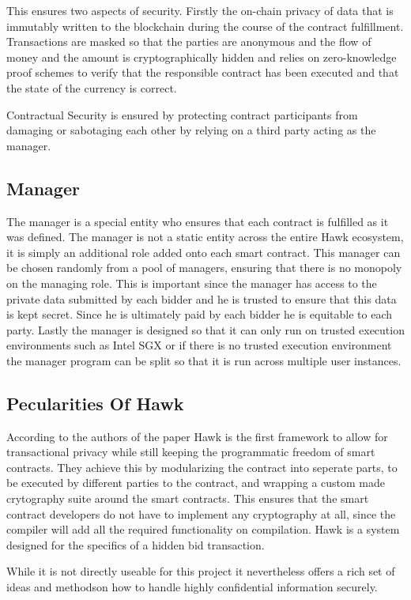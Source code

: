 This ensures two aspects of security. Firstly the on-chain privacy of data that is immutably written to the blockchain during the course of the contract fulfillment. Transactions are masked so that the parties are anonymous and the flow of money and the amount is cryptographically hidden and relies on zero-knowledge proof schemes to verify that the responsible contract has been executed and that the state of the currency is correct.

Contractual Security is ensured by protecting contract participants from damaging or sabotaging each other by relying on a third party acting as the manager.

\subsection{Manager}
The manager is a special entity who ensures that each contract is fulfilled as it was defined. The manager is not a static entity across the entire Hawk ecosystem, it is simply an additional role added onto each smart contract. This manager can be chosen randomly from a pool of managers, ensuring that there is no monopoly on the managing role. This is important since the manager has access to the private data submitted by each bidder and he is trusted to ensure that this data is kept secret. Since he is ultimately paid by each bidder he is equitable to each party. Lastly the manager is designed so that it can only run on trusted execution environments such as Intel SGX or if there is no trusted execution environment the manager program can be split so that it is run across multiple user instances.

\subsection{Pecularities Of Hawk}
According to the authors of the paper Hawk is the first framework to allow for transactional privacy while still keeping the programmatic freedom of smart contracts. They achieve this by modularizing the contract into seperate parts, to be executed by different parties to the contract, and wrapping a custom made crytography suite around the smart contracts. This ensures that the smart contract developers do not have to implement any cryptography at all, since the compiler will add all the required functionality on compilation. Hawk is a system designed for the specifics of a hidden bid transaction.

While it is not directly useable for this project it nevertheless offers a rich set of ideas and methodson how to handle highly confidential information securely.

